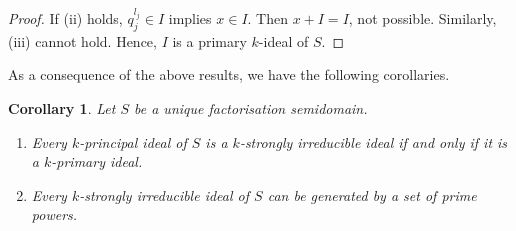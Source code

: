 \documentclass[11pt,english]{amsart}
\newtheorem{corollary}[theorem]{Corollary}
\theoremstyle{definition}
\numberwithin{equation}{section}
\begin{document}
\begin{proof}
    If (ii) holds, $q_j^{l_j}\in I$ implies $x \in I$. Then $x+I=I$, not possible. Similarly, (iii) cannot hold. Hence, $I$ is a primary $k$-ideal of $S$.
\end{proof}
As a consequence of the above results, we have the following corollaries.

\begin{corollary}
Let $S$ be a unique factorisation semidomain.
\begin{enumerate}

\item Every $k$-principal ideal of $S$ is a $k$-strongly irreducible ideal if and only if it is a
$k$-primary ideal.
	
\item Every $k$-strongly irreducible ideal of $S$ can be generated by a set of prime powers.
\end{enumerate}
\end{corollary}


\end{document}
